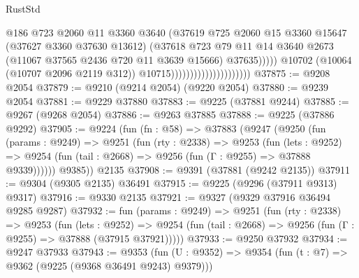 \begin{lexlean}{RustStd}
\begin{coremodule}
                                                    @186
                                                    @723
                                                    @2060
                                                    @11
                                                    @3360
                                                    @3640
                                                    (@37619
                                                      @725
                                                      @2060
                                                      @15
                                                      @3360
                                                      @15647
                                                      (@37627 @3360 @37630 @13612)
                                                      (@37618
                                                        @723
                                                        @79
                                                        @11
                                                        @14
                                                        @3640
                                                        @2673
                                                        (@11067 @37565 @2436 @720 @11 @3639 @15666)
                                                        @37635)))))
                                              @10702
                                              (@10064 (@10707 @2096 @2119 @312))
                                              @10715)))))))))))))))))))))
@37875 := @9208 @2054
@37879 := @9210 (@9214 @2054) (@9220 @2054)
@37880 := @9239 @2054
@37881 := @9229 @37880
@37883 := @9225 (@37881 @9244)
@37885 := @9267 (@9268 @2054)
@37886 := @9263 @37885
@37888 := @9225 (@37886 @9292)
@37905 := @9224
    (fun (fn : @58) =>
    @37883
      (@9247
        (@9250
          (fun (params : @9249) =>
          @9251
            (fun (rty : @2338) =>
            @9253
              (fun (lets : @9252) =>
              @9254 (fun (tail : @2668) => @9256 (fun (Γ : @9255) => @37888 @9339))))))
        @9385))
    @2135
@37908 := @9391 (@37881 (@9242 @2135))
@37911 := @9304 (@9305 @2135) @36491
@37915 := @9225 (@9296 (@37911 @9313) @9317)
@37916 := @9330 @2135
@37921 := @9327 (@9329 @37916 @36494 @9285 @9287)
@37932 := fun (params : @9249) =>
  @9251
    (fun (rty : @2338) =>
    @9253
      (fun (lets : @9252) =>
      @9254 (fun (tail : @2668) => @9256 (fun (Γ : @9255) => @37888 (@37915 @37921)))))
@37933 := @9250 @37932
@37934 := @9247 @37933
@37943 := @9353
    (fun (U : @9352) => @9354 (fun (t : @7) => @9362 (@9225 (@9368 @36491 @9243) @9379)))

\end{coremodule}
\end{lexlean}
